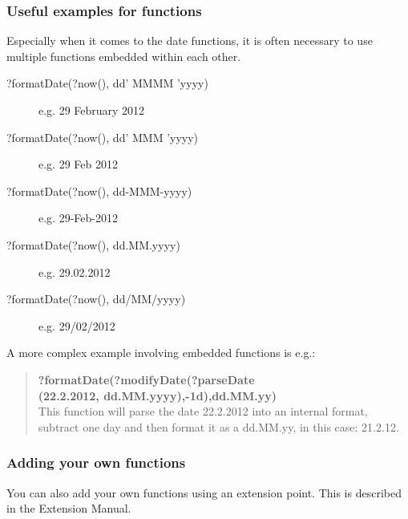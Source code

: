 \subsubsection{Useful examples for functions}
Especially when it comes to the date functions, it is often necessary to use multiple functions embedded within each other. 
\begin{description}
\item [?formatDate(?now(), dd' MMMM 'yyyy)]{e.g. 29 February 2012}
\item [?formatDate(?now(), dd' MMM 'yyyy)]{e.g. 29 Feb 2012}
\item [?formatDate(?now(), dd-MMM-yyyy)]{e.g. 29-Feb-2012}
\item [?formatDate(?now(), dd.MM.yyyy)]{e.g. 29.02.2012}
\item [?formatDate(?now(), dd/MM/yyyy)]{e.g. 29/02/2012}
\end{description}
A more complex example involving embedded functions is e.g.:

\begin{quote}
\textbf{?formatDate(?modifyDate(?parseDate\\(22.2.2012, dd.MM.yyyy),-1d),dd.MM.yy)}\\
This function will parse the date 22.2.2012 into an internal format, subtract one day and then format it as a dd.MM.yy, in this case: 21.2.12.
\end{quote}
\subsubsection{Adding your own functions}
You can also add your own functions using an extension point. This is described in the Extension Manual. 




